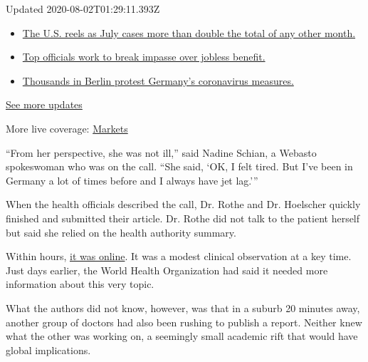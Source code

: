 Updated 2020-08-02T01:29:11.393Z

\begin{itemize}
\tightlist
\item
  \href{https://www.nytimes.com/2020/08/01/world/coronavirus-covid-19.html?action=click\&pgtype=Article\&state=default\&region=MAIN_CONTENT_1\&context=storylines_live_updates\#link-34047410}{The
  U.S. reels as July cases more than double the total of any other
  month.}
\item
  \href{https://www.nytimes.com/2020/08/01/world/coronavirus-covid-19.html?action=click\&pgtype=Article\&state=default\&region=MAIN_CONTENT_1\&context=storylines_live_updates\#link-3ac56579}{Top
  officials work to break impasse over jobless benefit.}
\item
  \href{https://www.nytimes.com/2020/08/01/world/coronavirus-covid-19.html?action=click\&pgtype=Article\&state=default\&region=MAIN_CONTENT_1\&context=storylines_live_updates\#link-25930521}{Thousands
  in Berlin protest Germany's coronavirus measures.}
\end{itemize}

\href{https://www.nytimes.com/2020/08/01/world/coronavirus-covid-19.html?action=click\&pgtype=Article\&state=default\&region=MAIN_CONTENT_1\&context=storylines_live_updates}{See
more updates}

More live coverage:
\href{https://www.nytimes.com/live/2020/07/31/business/stock-market-today-coronavirus?action=click\&pgtype=Article\&state=default\&region=MAIN_CONTENT_1\&context=storylines_live_updates}{Markets}

``From her perspective, she was not ill,'' said Nadine Schian, a Webasto
spokeswoman who was on the call. ``She said, `OK, I felt tired. But I've
been in Germany a lot of times before and I always have jet lag.'''

When the health officials described the call, Dr. Rothe and Dr.
Hoelscher quickly finished and submitted their article. Dr. Rothe did
not talk to the patient herself but said she relied on the health
authority summary.

Within hours,
\href{https://www.nejm.org/doi/full/10.1056/NEJMc2001468}{it was
online}. It was a modest clinical observation at a key time. Just days
earlier, the World Health Organization had said it needed more
information about this very topic.

What the authors did not know, however, was that in a suburb 20 minutes
away, another group of doctors had also been rushing to publish a
report. Neither knew what the other was working on, a seemingly small
academic rift that would have global implications.

